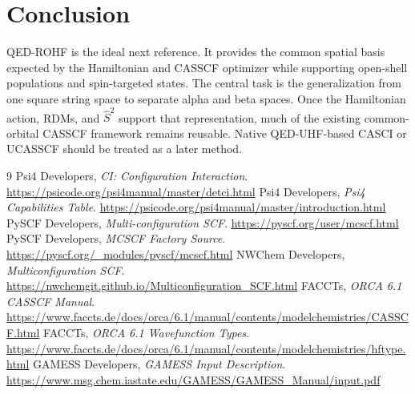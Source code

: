 \documentclass[11pt]{article}
\begin{document}
\section{Conclusion}

QED-ROHF is the ideal next reference. It provides the common spatial basis
expected by the Hamiltonian and CASSCF optimizer while supporting open-shell
populations and spin-targeted states. The central task is the generalization
from one square string space to separate alpha and beta spaces. Once the
Hamiltonian action, RDMs, and \(\hat S^2\) support that representation, much of
the existing common-orbital CASSCF framework remains reusable. Native
QED-UHF-based CASCI or UCASSCF should be treated as a later method.

\begin{thebibliography}{9}
 Psi4 Developers, \emph{CI: Configuration Interaction}.
\url{https://psicode.org/psi4manual/master/detci.html}
 Psi4 Developers, \emph{Psi4 Capabilities Table}.
\url{https://psicode.org/psi4manual/master/introduction.html}
 PySCF Developers, \emph{Multi-configuration SCF}.
\url{https://pyscf.org/user/mcscf.html}
 PySCF Developers, \emph{MCSCF Factory Source}.
\url{https://pyscf.org/_modules/pyscf/mcscf.html}
 NWChem Developers, \emph{Multiconfiguration SCF}.
\url{https://nwchemgit.github.io/Multiconfiguration_SCF.html}
 FACCTs, \emph{ORCA 6.1 CASSCF Manual}.
\url{https://www.faccts.de/docs/orca/6.1/manual/contents/modelchemistries/CASSCF.html}
 FACCTs, \emph{ORCA 6.1 Wavefunction Types}.
\url{https://www.faccts.de/docs/orca/6.1/manual/contents/modelchemistries/hftype.html}
 GAMESS Developers, \emph{GAMESS Input Description}.
\url{https://www.msg.chem.iastate.edu/GAMESS/GAMESS_Manual/input.pdf}
\end{thebibliography}
\end{document}
